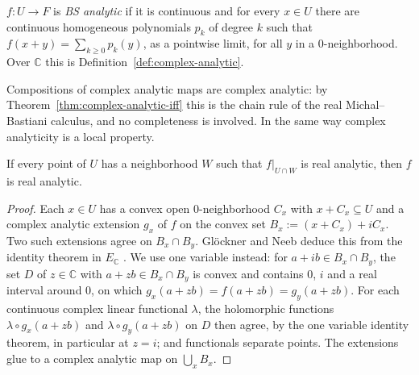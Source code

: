 \begin{definition}
  \label{def:bs-analytic}
  \leanok
  $f \colon U \to F$ is \emph{BS analytic} if it is continuous and for every $x \in U$ there are
  continuous homogeneous polynomials $p_k$ of degree $k$ such that
  $f(x + y) = \sum_{k \ge 0} p_k(y)$, as a pointwise limit, for all $y$ in a $0$-neighborhood.
  Over $\mathbb{C}$ this is Definition~\ref{def:complex-analytic}.
\end{definition}

Compositions of complex analytic maps are complex analytic: by
Theorem~\ref{thm:complex-analytic-iff} this is the chain rule of the real Michal--Bastiani
calculus, and no completeness is involved. In the same way complex analyticity is a local
property.

\begin{lemma}
  \label{lem:real-analytic-local}
  \leanok
  If every point of $U$ has a neighborhood $W$ such that $f|_{U \cap W}$ is real analytic, then
  $f$ is real analytic.
\end{lemma}

\begin{proof}
  \leanok
  Each $x \in U$ has a convex open $0$-neighborhood $C_x$ with $x + C_x \subseteq U$ and a
  complex analytic extension $g_x$ of $f$ on the convex set $B_x := (x + C_x) + i C_x$. Two such
  extensions agree on $B_x \cap B_y$. Glöckner and Neeb deduce this from the identity theorem in
  $E_{\mathbb{C}}$ \cite[Thm.~2.1.16(c)]{GN26}. We use one variable instead: for $a + ib \in B_x
  \cap B_y$, the set $D$ of $z \in \mathbb{C}$ with $a + zb \in B_x \cap B_y$ is convex and
  contains $0$, $i$ and a real interval around $0$, on which $g_x(a + zb) = f(a + zb) =
  g_y(a + zb)$. For each continuous complex linear functional $\lambda$, the holomorphic
  functions $\lambda \circ g_x(a + zb)$ and $\lambda \circ g_y(a + zb)$ on $D$ then agree, by the
  one variable identity theorem, in particular at $z = i$; and functionals separate points.
  The extensions glue to a complex analytic map on $\bigcup_x B_x$.
\end{proof}


